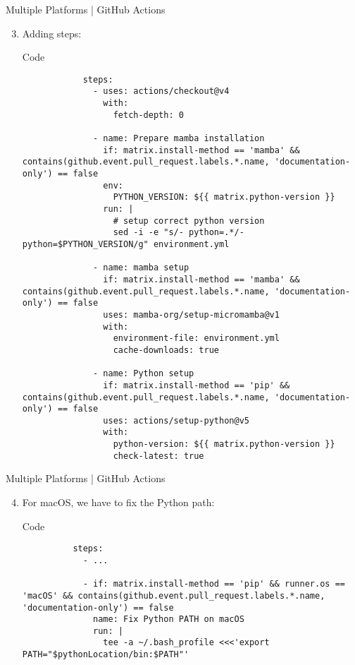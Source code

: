 \begin{frame}[fragile]{
    Multiple Platforms | GitHub Actions
  }
  \begin{enumerate}
    \setcounter{enumi}{2}
    \item Adding steps:
      \begin{block}{Code}
        \scriptsize
        \begin{verbatim}
            steps:
              - uses: actions/checkout@v4
                with:
                  fetch-depth: 0

              - name: Prepare mamba installation
                if: matrix.install-method == 'mamba' &&  contains(github.event.pull_request.labels.*.name, 'documentation-only') == false
                env:
                  PYTHON_VERSION: ${{ matrix.python-version }}
                run: |
                  # setup correct python version
                  sed -i -e "s/- python=.*/- python=$PYTHON_VERSION/g" environment.yml

              - name: mamba setup
                if: matrix.install-method == 'mamba' && contains(github.event.pull_request.labels.*.name, 'documentation-only') == false
                uses: mamba-org/setup-micromamba@v1
                with:
                  environment-file: environment.yml
                  cache-downloads: true

              - name: Python setup
                if: matrix.install-method == 'pip' && contains(github.event.pull_request.labels.*.name, 'documentation-only') == false
                uses: actions/setup-python@v5
                with:
                  python-version: ${{ matrix.python-version }}
                  check-latest: true
        \end{verbatim}
      \end{block}
  \end{enumerate}
\end{frame}

\begin{frame}[fragile]{
    Multiple Platforms | GitHub Actions
  }
  \begin{enumerate}
    \setcounter{enumi}{3}
    \item For macOS, we have to fix the Python path:
      \begin{block}{Code}
        \scriptsize
        \begin{verbatim}
          steps:
            - ...

            - if: matrix.install-method == 'pip' && runner.os == 'macOS' && contains(github.event.pull_request.labels.*.name, 'documentation-only') == false
              name: Fix Python PATH on macOS
              run: |
                tee -a ~/.bash_profile <<<'export PATH="$pythonLocation/bin:$PATH"'
        \end{verbatim}
      \end{block}
  \end{enumerate}
\end{frame}

